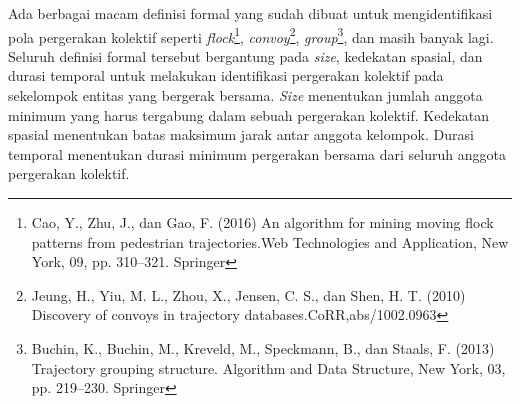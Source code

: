 \documentclass[a4paper,twoside]{article}
\begin{document}
\iffalse

\begin{figure}[t]
    \centering
    \begin{subfigure}[h]{0.475\textwidth}
        \centering
        \texttt{[image: Gambar/bab1:army.jpg]}
        \caption{Kumpulan tentara bergerak bersama membentuk sebuah regu}
    \end{subfigure}
    \begin{subfigure}[h]{0.475\textwidth}
        \centering
        \texttt{[image: Gambar/bab1:wildebeest.jpg]}
        \caption{Kawanan \textit{wildebeest} membentuk \textit{herd} untuk melakukan migrasi musiman}
    \end{subfigure}
    \caption[Pergerakan kolektif dunia nyata]{Pergerakan kolektif yang sering kita temui di dunia nyata}
    \label{bab1:collective-movement}
\end{figure}

\addtocounter{footnote}{-1} %

\stepcounter{footnote}\footnotetext{Damon On Road, \textit{C\'{e}r\'{e}monie militaire du Man\`{e}ge militaire du Qu\'{e}bec}, 2020, diakses pada tanggal 4 Januari 2021, \url{https://unsplash.com/photos/nmePDwaW9I8}}

\stepcounter{footnote}\footnotetext{Jorge Tung, \textit{Great wildebeest migration crossing Mara river at Serengeti National Park}, 2019, diakses pada tanggal 23 Desember 2020, \url{https://unsplash.com/photos/1pZJqQlgpsY}}

\fi

Ada berbagai macam definisi formal yang sudah dibuat untuk mengidentifikasi pola pergerakan kolektif seperti \textit{flock}\footnote{Cao, Y., Zhu, J., dan Gao, F. (2016) An algorithm for mining moving flock patterns from pedestrian trajectories.Web Technologies and Application, New York, 09, pp. 310–321. Springer}, \textit{convoy}\footnote{Jeung, H., Yiu, M. L., Zhou, X., Jensen, C. S., dan Shen, H. T. (2010) Discovery of convoys in trajectory databases.CoRR,abs/1002.0963}, \textit{group}\footnote{Buchin, K., Buchin, M., Kreveld, M., Speckmann, B., dan Staals, F. (2013) Trajectory grouping structure. Algorithm and Data Structure, New York, 03, pp. 219–230. Springer}, dan masih banyak lagi. Seluruh definisi formal tersebut bergantung pada \textit{size}, kedekatan spasial, dan durasi temporal untuk melakukan identifikasi pergerakan kolektif pada sekelompok entitas yang bergerak bersama. \textit{Size} menentukan jumlah anggota minimum yang harus tergabung dalam sebuah pergerakan kolektif. Kedekatan spasial menentukan batas maksimum jarak antar anggota kelompok. Durasi temporal menentukan durasi minimum pergerakan bersama dari seluruh anggota pergerakan kolektif.
\end{document}
